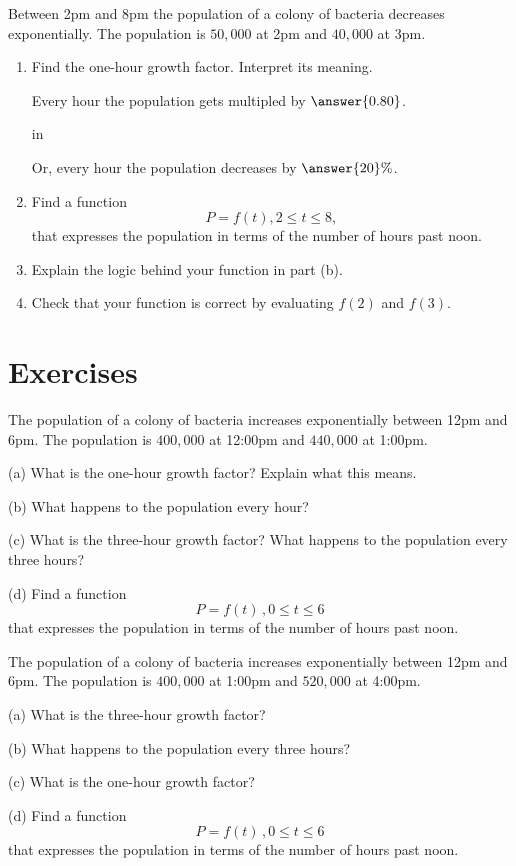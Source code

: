 \documentclass{ximera}
\newcommand{\pskip}{\vskip 0.1 in}
\begin{document}
\begin{example}  \label{Ex432234e3r}
Between 2pm and 8pm the population of a colony of bacteria decreases exponentially. The population is $50,000$ at 2pm and $40,000$ at 3pm.

\begin{enumerate}
\item Find the one-hour growth factor. Interpret its meaning.

Every hour the population gets multipled by $\answer{0.80}$.

\pskip

Or, every hour the population decreases by $\answer{20}\%$.

\item Find a function
\[
        P = f(t) , 2\leq t \leq 8 ,   
\] 
that expresses the population in terms of the number of hours past noon.

\item Explain the logic behind your function in part (b).

\item Check that your function is correct by evaluating $f(2)$ and $f(3)$.
\end{enumerate}
\end{example}



\section{Exercises}
\begin{question}   \label{Q4:ExponentialG}
The population of a colony of bacteria increases exponentially between 12pm and 6pm. The population is $400,000$ at 12:00pm and $440,000$ at 1:00pm. 

(a) What is the one-hour growth factor? Explain what this means.

(b) What happens to the population every hour?

(c) What is the three-hour growth factor? What happens to the population every three hours?

(d) Find a function 
\[
     P = f(t) \, , 0\leq t \leq 6 
\]
that expresses the population in terms of the number of hours past noon.

\end{question}


\begin{question}   \label{Q5:ExponentialG}
The population of a colony of bacteria increases exponentially between 12pm and 6pm. The population is $400,000$ at 1:00pm and $520,000$ at 4:00pm. 

(a) What is the three-hour growth factor?

(b) What happens to the population every three hours?

(c) What is the one-hour growth factor?

(d) Find a function 
\[
     P = f(t) \, , 0\leq t \leq 6 
\]
that expresses the population in terms of the number of hours past noon.

\end{question}
\end{document}
